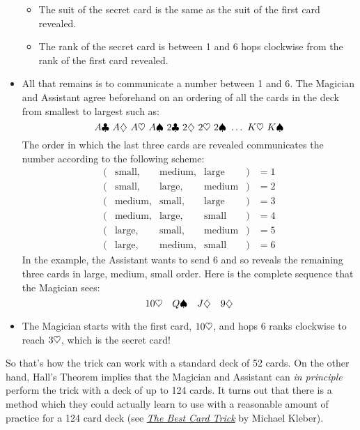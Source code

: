 \begin{itemize}
\begin{itemize}

\item The suit of the secret card is the same as the suit of the first
card revealed.

\item The rank of the secret card is between 1 and 6 hops clockwise
from the rank of the first card revealed.

\end{itemize}

\item All that remains is to communicate a number between 1 and 6.
The Magician and Assistant agree beforehand on an ordering of all the
cards in the deck from smallest to largest such as:
%
\[
A \clubsuit\  A \diamondsuit\  A \heartsuit\ A \spadesuit\
2 \clubsuit\  2 \diamondsuit\  2 \heartsuit\ 2 \spadesuit\
\dots\ K \heartsuit\ K \spadesuit
\]
%
The order in which the last three cards are revealed communicates the
number according to the following scheme:
%
\[
\begin{array}{rcccll}
(&\text{small},&\text{medium},&\text{large}&) & = 1 \\
(&\text{small},&\text{large},&\text{medium}&) & = 2 \\
(&\text{medium},&\text{small},&\text{large}&) & = 3 \\
(&\text{medium},&\text{large},&\text{small}&) & = 4 \\
(&\text{large},&\text{small},&\text{medium}&) & = 5 \\
(&\text{large},&\text{medium},&\text{small}&) & = 6
\end{array}
\]
%
In the example, the Assistant wants to send 6 and so reveals the
remaining three cards in large, medium, small order.  Here is the
complete sequence that the Magician sees:
%
\[
10 \heartsuit \quad Q \spadesuit \quad J \diamondsuit \quad 9 \diamondsuit
\]

\item The Magician starts with the first card, $10 \heartsuit$, and hops 6
ranks clockwise to reach $3 \heartsuit$, which is the secret card!

\end{itemize}

So that's how the trick can work with a standard deck of 52 cards.  On the
other hand, Hall's Theorem implies that the Magician and Assistant can
\emph{in principle} perform the trick with a deck of up to 124 cards.  It
turns out that there is a method which they could actually learn to use
with a reasonable amount of practice for a 124 card deck (see
\href{http://courses.csail.mit.edu/6.042/fall09/cardTrick.pdf}{\emph{The Best
    Card Trick}} by Michael Kleber).

